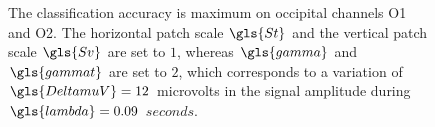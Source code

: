 \begin{figure}[h!]
\centering
{}
\caption[Dataset I Classification Rate]{The classification accuracy is maximum on occipital channels O1 and O2. The horizontal patch scale $\gls{St}$ and the vertical patch scale $\gls{Sv}$ are set to $1$, whereas $\gls{gamma}$ and $\gls{gammat}$ are set to $2$, which corresponds to a variation of $\gls{DeltamuV} = 12$ microvolts in the signal amplitude during $\gls{lambda}=0.09$ $\si{seconds}$.}
\label{fig:alpharesultsdataseti}
\end{figure}

   

   
